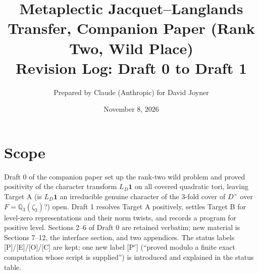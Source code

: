\documentclass[11pt]{article}
\title{Metaplectic Jacquet--Langlands Transfer, Companion Paper (Rank Two, Wild Place)\\Revision Log: Draft 0 to Draft 1}
\author{Prepared by Claude (Anthropic) for David Joyner}
\date{November 8, 2026}
\newcommand{\Q}{\mathbb Q}
\begin{document}
\maketitle

\section*{Scope}
Draft 0 of the companion paper set up the rank-two wild problem and proved
positivity of the character transform $L_D\mathbf 1$ on all covered quadratic
tori, leaving Target A (is $L_D\mathbf 1$ an irreducible genuine character of
the $3$-fold cover of $D^\times$ over $F=\Q_3(\zeta_3)$?) open.  Draft 1
resolves Target A positively, settles Target B for level-zero
representations and their norm twists, and records a program for positive
level.  Sections 2--6 of Draft 0 are retained verbatim; new material is
Sections 7--12, the interface section, and two appendices.  The status
labels [P]/[E]/[O]/[C] are kept; one new label [P$^c$] (``proved modulo a
finite exact computation whose script is supplied'') is introduced and
explained in the status table.
\end{document}
